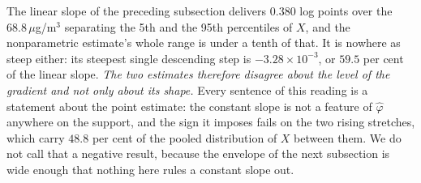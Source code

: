 \documentclass[
  12pt]{article}
\newcommand{\1}[1]{\mathds{1}\left[#1\right]}
\theoremstyle{plain}
\theoremstyle{definition}
\theoremstyle{definition}
\theoremstyle{remark}
\begin{document}
The linear slope of the preceding subsection delivers \(0.380\) log
points over the \(68.8\,\mu\)g/m\(^3\) separating the 5th and the 95th
percentiles of \(X\), and the nonparametric estimate's whole range is
under a tenth of that. It is nowhere as steep either: its steepest
single descending step is \(-3.28\times10^{-3}\), or \(59.5\) per cent
of the linear slope. \emph{The two estimates therefore disagree about
the level of the gradient and not only about its shape.} Every sentence
of this reading is a statement about the point estimate: the constant
slope is not a feature of \(\hat\varphi\) anywhere on the support, and
the sign it imposes fails on the two rising stretches, which carry
\(48.8\) per cent of the pooled distribution of \(X\) between them. We
do not call that a negative result, because the envelope of the next
subsection is wide enough that nothing here rules a constant slope out.
\end{document}
